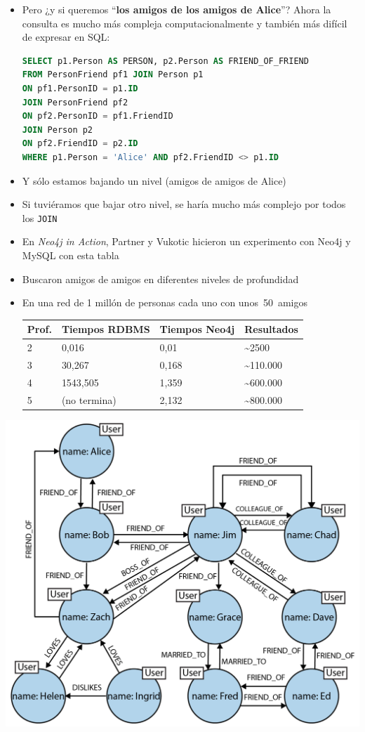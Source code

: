 \documentclass[14pt]{beamer}
\begin{document}
\begin{frame}
\begin{itemize}
\item Pero ¿y si queremos ``{\bf los amigos de los amigos de Alice}''?
  Ahora la consulta es mucho más compleja computacionalmente y también más
  difícil de expresar en SQL:

\begin{lstlisting}[language=SQL]
SELECT p1.Person AS PERSON, p2.Person AS FRIEND_OF_FRIEND
FROM PersonFriend pf1 JOIN Person p1
ON pf1.PersonID = p1.ID
JOIN PersonFriend pf2
ON pf2.PersonID = pf1.FriendID
JOIN Person p2
ON pf2.FriendID = p2.ID
WHERE p1.Person = 'Alice' AND pf2.FriendID <> p1.ID
\end{lstlisting}

\item Y sólo estamos bajando un nivel (amigos de amigos de Alice)
\item Si tuviéramos que bajar otro nivel, se haría mucho más complejo por
  todos los {\tt JOIN}

\item En {\em Neo4j in Action\/}, Partner y Vukotic hicieron un experimento
  con Neo4j y MySQL con esta tabla
\item Buscaron amigos de amigos en diferentes niveles de profundidad
\item En una red de 1 millón de personas cada uno con unos~50~amigos

  \begin{small}
    \begin{tabular}{llll}
      \toprule
      Prof.& Tiempos RDBMS & Tiempos Neo4j & Resultados\\
      \midrule
      2&0,016&0,01&\~{}2500\\
      3&30,267&0,168&\~{}110.000\\
      4&1543,505&1,359&\~{}600.000\\
      5&(no termina)&2,132&\~{}800.000\\
      \bottomrule
    \end{tabular}
  \end{small}
\end{itemize}

\begin{center}
  \includegraphics[width=.78\textwidth]{img/graph3}
\end{center}
\end{frame}
\end{document}
